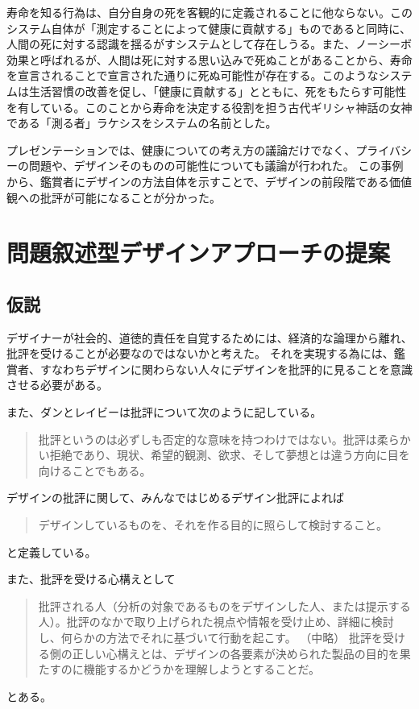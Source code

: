 \documentclass{jsarticle}
\begin{document}
寿命を知る行為は、自分自身の死を客観的に定義されることに他ならない。このシステム自体が「測定することによって健康に貢献する」ものであると同時に、人間の死に対する認識を揺るがすシステムとして存在しうる。また、ノーシーボ効果と呼ばれるが、人間は死に対する思い込みで死ぬことがあることから、寿命を宣言されることで宣言された通りに死ぬ可能性が存在する。このようなシステムは生活習慣の改善を促し、「健康に貢献する」とともに、死をもたらす可能性を有している。このことから寿命を決定する役割を担う古代ギリシャ神話の女神である「測る者」ラケシスをシステムの名前とした。

プレゼンテーションでは、健康についての考え方の議論だけでなく、プライバシーの問題や、デザインそのものの可能性についても議論が行われた。
この事例から、鑑賞者にデザインの方法自体を示すことで、デザインの前段階である価値観への批評が可能になることが分かった。


\newpage

\section{問題叙述型デザインアプローチの提案}

\subsection{仮説}



デザイナーが社会的、道徳的責任を自覚するためには、経済的な論理から離れ、批評を受けることが必要なのではないかと考えた。
それを実現する為には、鑑賞者、すなわちデザインに関わらない人々にデザインを批評的に見ることを意識させる必要がある。

また、ダンとレイビーは批評について次のように記している。
\begin{quotation}
批評というのは必ずしも否定的な意味を持つわけではない。批評は柔らかい拒絶であり、現状、希望的観測、欲求、そして夢想とは違う方向に目を向けることでもある。
\end{quotation}


デザインの批評に関して、みんなではじめるデザイン批評によれば

\begin{quotation}
 デザインしているものを、それを作る目的に照らして検討すること。
\end{quotation}
 と定義している。


 また、批評を受ける心構えとして
 \begin{quotation}
 批評される人（分析の対象であるものをデザインした人、または提示する人）。批評のなかで取り上げられた視点や情報を受け止め、詳細に検討し、何らかの方法でそれに基づいて行動を起こす。
 （中略）
 批評を受ける側の正しい心構えとは、デザインの各要素が決められた製品の目的を果たすのに機能するかどうかを理解しようとすることだ。
\end{quotation}
 とある。
\end{document}

